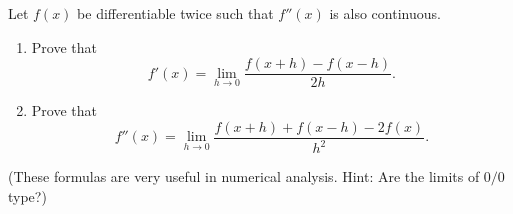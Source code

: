 \begingroup
\renewcommand{\labelenumi}{(\roman{enumi})}
\begin{exercise}
  \label{ex:hw07:symmetric-differences}
  Let $f(x)$ be differentiable twice such that $f''(x)$ is also continuous.
  \begin{enumerate}
    \item Prove that
      \[
        f'(x)=\lim_{h\to0}\frac{f(x+h)-f(x-h)}{2h}.
      \]
    \item Prove that
      \[
        f''(x)=\lim_{h\to0}
          \frac{f(x+h)+f(x-h)-2f(x)}{h^2}.
      \]
  \end{enumerate}
  (These formulas are very useful in numerical analysis. Hint: Are the
  limits of $0/0$ type?)
\end{exercise}
\endgroup
